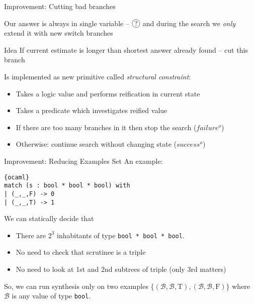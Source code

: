 \documentclass[aspectratio=169
  , xcolor={svgnames}
  , hyperref={ colorlinks,citecolor=Blue
             , linkcolor=DarkRed,urlcolor=DarkBlue}
  , russian
  ]{beamer}
\newcommand*\circled[1]{\tikz[baseline=(char.base)]{
    \node[shape=circle,draw,inner sep=1pt] (char) {#1};}}
\begin{document}
\begin{frame}{Improvement: Cutting bad branches}

Our answer is always in single variable -- $\circled{?}$ and during the search we \emph{only} extend it with new switch branches\\

\begin{alertblock}{Idea}
If current estimate is longer than shortest answer already found -- cut this branch
\end{alertblock}

Is implemented as new primitive called \emph{structural constraint}:
\begin{itemize}
\item Takes a logic value and performs reification in current state
\item Takes a predicate which investigates reified value 
\item If there are too many branches in it then stop the search ($failure^o$)
\item Otherwise: continue search without changing state ($success^o$)
\end{itemize}

\end{frame}


\begin{frame}[fragile]{Improvement: Reducing Examples Set}
An example:
\begin{lstlisting}{ocaml}
match (s : bool * bool * bool) with 
| (_,_,F) -> 0
| (_,_,T) -> 1
\end{lstlisting}
\vspace{.5cm}
We can statically decide that 

\begin{itemize}
\item There are $2^3$ inhabitants of type \lstinline=bool * bool * bool=.
\item No need to  check that scrutinee is a triple
\item No need to look at 1st and 2nd subtrees of triple (only 3rd matters)
\end{itemize}
\vspace{.5cm}

So, we can run synthesis only on two examples $\{(\mathcal{B},\mathcal{B},\text{T}),(\mathcal{B},\mathcal{B},\text{F})\}$
where $\mathcal{B}$ is any value of type \lstinline=bool=.
\end{frame}
\end{document}
